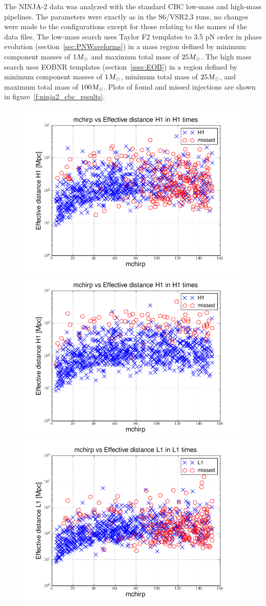 The NINJA-2 data was analyzed with the standard CBC low-mass and
high-mass pipelines.  The parameters were exactly as in the S6/VSR2,3
runs, no changes were made to the configurations except for those
relating to the names of the data files.  The low-mass search uses
Taylor F2 templates to 3.5 pN order in phase evolution
(section~\ref{sec:PNWaveforms}) in a mass region defined by minimum component
masses of $1 M_\odot$ and maximum total mass of $25 M_\odot$.  The high
mass search uses EOBNR templates (section~\ref{ssec:EOB}) in a region
defined by minimum component masses of $1 M_\odot$, minimum total mass
of $25 M_\odot$, and maximum total mass of $100 M_\odot$.  Plots of found
and missed injections are shown in figure~\ref{f:ninja2_cbc_results}.

\begin{figure}
  \includegraphics[width=0.5\linewidth]{figures/ninja2/H1-plotinspmissed_LOW_FULL_DATA_mchirp-eff_dist-log-H1-871147552-5209912.png}
  \includegraphics[width=0.5\linewidth]{figures/ninja2/H1-plotinspmissed_HIGH_FULL_DATA_mchirp-eff_dist-log-H1-871147552-5209912.png} \\
  \includegraphics[width=0.5\linewidth]{figures/ninja2/L1-plotinspmissed_LOW_FULL_DATA_mchirp-eff_dist-log-L1-871147552-5209912.png}

\end{figure}

